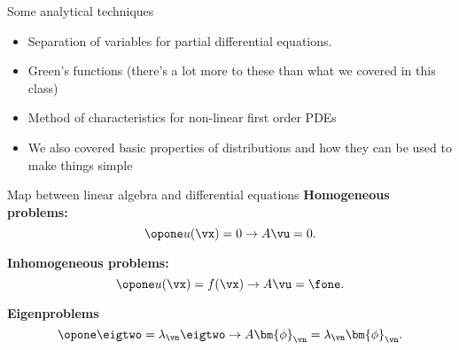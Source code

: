 \begin{frame}{Some analytical techniques}
	\begin{itemize}[<+->]
		\item Separation of variables for partial differential equations.
		\item Green's functions (there's a lot more to these than what we covered in this class)
		\item Method of characteristics for non-linear first order PDEs
		\item We also covered basic properties of distributions and how they can be used to make things simple
	\end{itemize}
\end{frame}

\begin{frame}{Map between linear algebra and differential equations}
	\textbf{Homogeneous problems:}
	\[ \opone u(\vx) = 0 \to A\vu = 0. \]
	
	\pause
	\textbf{Inhomogeneous problems:}
	\[ \opone u(\vx) = f(\vx) \to A \vu = \fone. \]
	
	\pause
	\textbf{Eigenproblems}
	\[ \opone \eigtwo = \lambda_{\vn} \eigtwo \to A \bm{\phi}_{\vn} = \lambda_{\vn}\bm{\phi}_{\vn}. \]
\end{frame}



